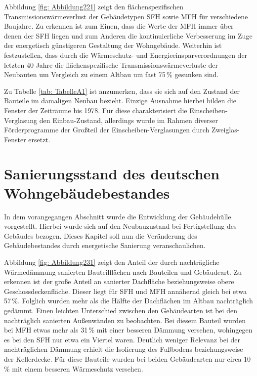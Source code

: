 Abbildung \ref{fig: Abbildung221} zeigt den flächenspezifischen Transmissionswärmeverlust der Gebäudetypen SFH sowie MFH für verschiedene Baujahre. 
Zu erkennen ist zum Einen, dass die Werte der MFH immer über denen der SFH liegen und zum Anderen die kontinuierliche Verbesserung im Zuge der energetisch günstigeren Gestaltung der Wohngebäude.
Weiterhin ist festzustellen, dass durch die Wärmeschutz- und Energieeinsparverordnungen der letzten 40 Jahre die flächenspezifische Transmissionswärmeverluste der Neubauten um Vergleich zu einem Altbau um fast 75\,\% gesunken sind.

Zu Tabelle \ref{tab: TabelleA1} ist anzumerken, dass sie sich auf den Zustand der Bauteile im damaligen Neubau bezieht. 
Einzige Ausnahme hierbei bilden die Fenster der Zeiträume bis 1978. 
Für diese charakterisiert die Einscheiben-Verglasung den Einbau-Zustand, allerdings wurde im Rahmen diverser Förderprogramme der Großteil der Einscheiben-Verglasungen durch Zweiglas-Fenster ersetzt.


\section{Sanierungsstand des deutschen Wohngebäudebestandes}
\label{sec:Sektion 23}

In dem vorangegangen Abschnitt wurde die Entwicklung der Gebäudehülle vorgestellt. 
Hierbei wurde sich auf den Neubauzustand bei Fertigstellung des Gebäudes bezogen.
Dieses Kapitel soll nun die Veränderung des Gebäudebestandes durch energetische Sanierung veranschaulichen.

Abbildung \ref{fig: Abbildung231} zeigt den Anteil der durch nachträgliche Wärmedämmung sanierten Bauteilflächen nach Bauteilen und Gebäudeart.
Zu erkennen ist der große Anteil an sanierter Dachfläche beziehungsweise obere Geschossdeckenfläche.
Dieser liegt für SFH und MFH annähernd gleich bei etwa 57\,\%.
Folglich wurden mehr als die Hälfte der Dachflächen im Altbau nachträglich gedämmt.
Einen leichten Unterschied zwischen den Gebäudearten ist bei den nachträglich sanierten Außenwänden zu beobachten. 
Bei diesem Bauteil wurden bei MFH etwas mehr als 31\,\% mit einer besseren Dämmung versehen, wohingegen es bei den SFH nur etwa ein Viertel waren.
Deutlich weniger Relevanz bei der nachträglichen Dämmung erhielt die Isolierung des Fußbodens beziehungsweise der Kellerdecke. 
Für diese Bauteile wurden bei beiden Gebäudearten nur circa 10\,\% mit einem besseren Wärmeschutz versehen. 

